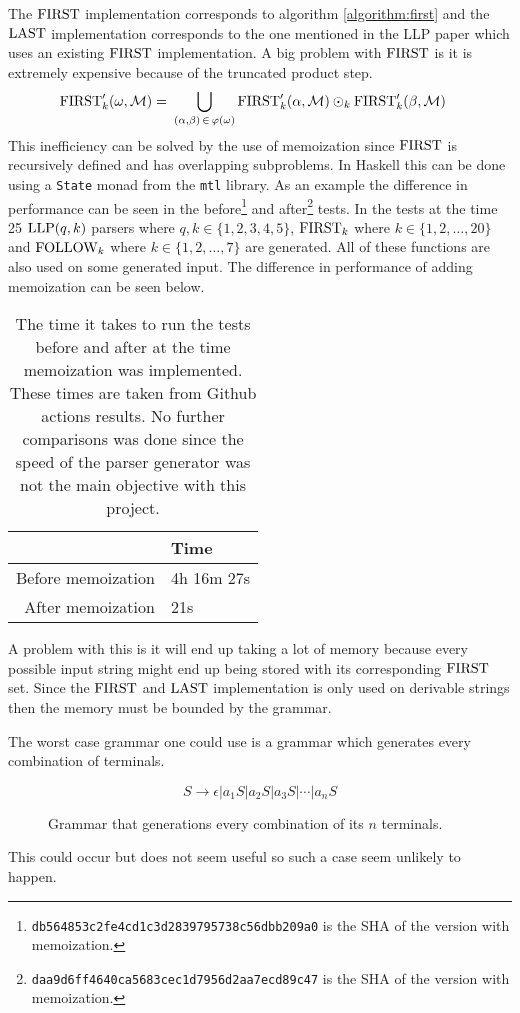 The $\text{FIRST}$ implementation corresponds to algorithm \ref{algorithm:first} and the $\text{LAST}$ implementation corresponds to the one mentioned in the LLP paper \cite[12]{Vagner2007} which uses an existing $\text{FIRST}$ implementation. A big problem with $\text{FIRST}$ is it is extremely expensive because of the truncated product step.
\begin{align*}
    \text{FIRST}'_k(\omega, \mathcal{M}) =&\,\, \bigcup_{(\alpha, \beta) \, \in \, \varphi(\omega)} \text{FIRST}'_k(\alpha, \mathcal{M}) \odot_k \text{FIRST}'_k(\beta, \mathcal{M})
\end{align*}
This inefficiency can be solved by the use of memoization since $\text{FIRST}$ is recursively defined and has overlapping subproblems. In Haskell this can be done using a \lstinline|State| monad from the \lstinline|mtl| library. As an example the difference in performance can be seen in the before\footnote{\texttt{db564853c2fe4cd1c3d2839795738c56dbb209a0} is the SHA of the version with memoization.} and after\footnote{\texttt{daa9d6ff4640ca5683cec1d7956d2aa7ecd89c47} is the SHA of the version with memoization.} tests. In the tests at the time 25 $\text{LLP}(q,k)$ parsers where $q, k \in \{1, 2, 3, 4, 5\}$, $\text{FIRST}_k$ where $k \in \{1, 2, \dots, 20\}$ and $\text{FOLLOW}_k$ where $k \in \{1, 2, \dots, 7\}$ are generated. All of these functions are also used on some generated input. The difference in performance of adding memoization can be seen below. 
\begin{table}[H]
    \centering
    \begin{tabular}{r|l}
         & Time \\ \hline
        Before memoization & 4h 16m 27s \\
        After memoization & 21s
    \end{tabular}
    \caption{The time it takes to run the tests before and after at the time memoization was implemented. These times are taken from Github actions results. No further comparisons was done since the speed of the parser generator was not the main objective with this project.}
\end{table}
\noindent A problem with this is it will end up taking a lot of memory because every possible input string might end up being stored with its corresponding $\text{FIRST}$ set. Since the $\text{FIRST}$ and $\text{LAST}$ implementation is only used on derivable strings then the memory must be bounded by the grammar.

The worst case grammar one could use is a grammar which generates every combination of terminals.
\begin{figure}
    \begin{equation}
        \label{fig:combination-grammar}
        S \to \epsilon | a_1 S | a_2 S | a_3 S | \cdots | a_n S
    \end{equation}
    \caption{Grammar that generations every combination of its $n$ terminals.}    
\end{figure}
This could occur but does not seem useful so such a case seem unlikely to happen.